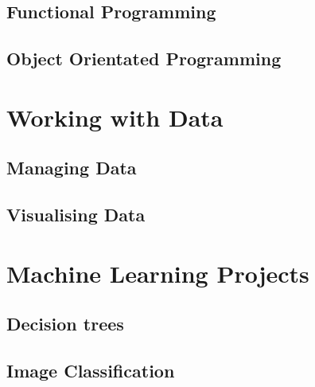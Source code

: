 \chapter{Functional Programming} \label{ch:Functional}


\chapter{Object Orientated Programming} 
\label{ch:OOP}

\part{Working with Data} 
\label{ch:Data}
\chapter{Managing Data} \label{ch:ManagingData}

\chapter{Visualising Data} \label{ch:Graphs}


\part{Machine Learning Projects} 
\label{ch:MLProject}
\chapter{Decision trees}\label{ch:DecisionTrees}

\chapter{Image Classification}\label{ch:ImageClass}


